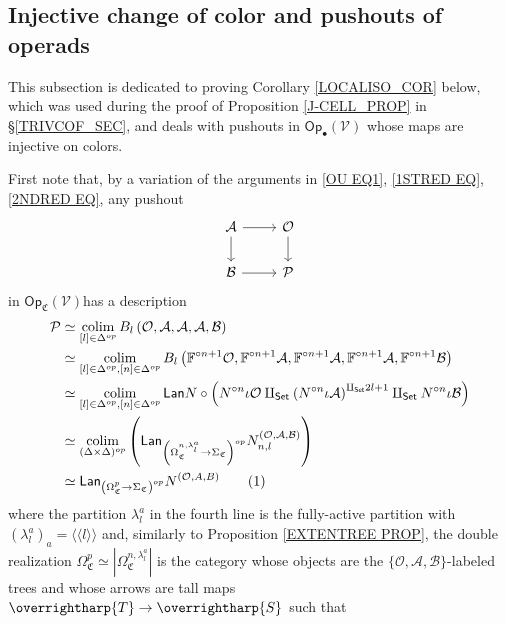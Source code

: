 \documentclass[a4paper,10pt
,draft
]{article}%
\numberwithin{equation}{section}
\numberwithin{figure}{section}
\theoremstyle{definition} %
\newcommand{\vect}[1]{\text{\overrightharp{\ensuremath{#1}}}}
\DeclareMathOperator{\colim}{colim}%
\newcommand{\V}{\ensuremath{\mathcal V}}
\renewcommand{\O}{\ensuremath{\mathcal O}}
\newcommand{\1}{\ensuremath{\mathbbm 1}}%
\newcommand{\OC}{\Omega_{\mathfrak C}}
\begin{document}
\subsection{Injective change of color and pushouts of operads}

This subsection is dedicated to proving
Corollary \ref{LOCALISO_COR} below,
which was used 
during the proof of Proposition \ref{J-CELL_PROP}
in \S \ref{TRIVCOF_SEC},
and deals with pushouts in 
$\mathsf{Op}_{\bullet}(\V)$
whose maps are injective on colors.





First note that, by a variation of the arguments in \eqref{OU EQ1}, \eqref{1STRED EQ}, \eqref{2NDRED EQ},
any pushout 
\[
\begin{tikzcd}
	\mathcal{A} \ar{r} \ar{d} & \mathcal{O} \ar{d}
\\
	\mathcal{B} \ar{r} & \mathcal{P}
\end{tikzcd}
\]
in $\mathsf{Op}_{\mathfrak{C}}(\V) $has a description
\begin{align*}
  \mathcal{P}
  &
    \simeq \colim_{[l] \in \Delta^{op}} 
    B_l \left( \O, \mathcal{A}, \mathcal{A}, \mathcal{A}, \mathcal{B} \right)
  \\
  &
    \simeq \colim_{[l] \in \Delta^{op},[n] \in \Delta^{op}} 
    B_l \left( 
    \mathbb F^{\circ n+1} \O, 
    \mathbb F^{\circ n+1} \mathcal{A}, 
    \mathbb F^{\circ n+1} \mathcal{A}, 
    \mathbb F^{\circ n+1} \mathcal{A}, 
    \mathbb F^{\circ n+1} \mathcal{B} \right)
\\
&
    \simeq \colim_{[l] \in \Delta^{op},[n] \in \Delta^{op}} 
    \mathsf{Lan} N \circ \left( N^{\circ n} \iota \O 
		\amalg_{\mathsf{Set}}
	\left( N^{\circ n} \iota \mathcal{A}\right)^{\amalg_{\mathsf{Set}} 2l +1}
		\amalg_{\mathsf{Set}}
	N^{\circ n} \iota \mathcal{B} \right)
\\
&	
	\simeq
	\mathop{\colim}\limits_{(\Delta \times \Delta)^{op}}
\left(
	\mathsf{Lan}_{\left(\Omega_{\mathfrak C}^{n,\lambda^a_l} \to \Sigma_{\mathfrak C}\right)^{op}} N_{n,l}^{(\O,\mathcal{A},\mathcal{B})}
\right)
\\
&	
	\simeq
	\mathsf{Lan}_{\left(\Omega_{\mathfrak C}^{p} \to
	\Sigma_{\mathfrak C}\right)^{op}} N^{(\O,A,B)}
    \stepcounter{equation}\tag{\theequation}\label{OU EQ2}
\end{align*}
where the partition $\lambda^a_l$ in the fourth line is the fully-active partition with $\left(\lambda^a_l\right)_a = \langle \langle l \rangle \rangle$
and, similarly to Proposition \ref{EXTENTREE PROP},
the double realization
$\OC^p \simeq |\Omega_{\mathfrak C}^{n,\lambda^a_l}|$
is the category whose objects are the
$\{\mathcal{O},\mathcal{A},\mathcal{B}\}$-labeled trees
and whose arrows are tall maps $\vect{T} \to \vect{S}$ such that
\end{document}
